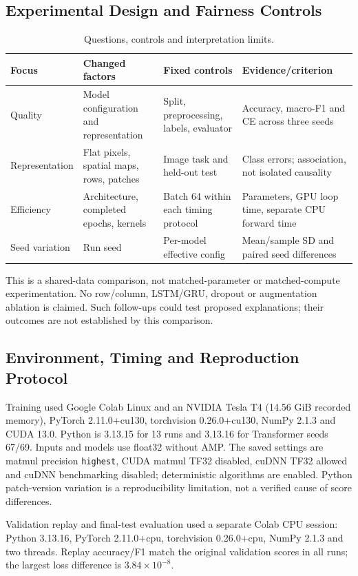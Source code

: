 \subsection{Experimental Design and Fairness Controls}
\begin{table}[H]\centering\small
\caption{Questions, controls and interpretation limits.}
\label{tab:design}
\begin{tabularx}{\linewidth}{>{\raggedright\arraybackslash}p{25mm}YYY}
\toprule Focus & Changed factors & Fixed controls & Evidence/criterion\\\midrule
Quality & Model configuration and representation & Split, preprocessing, labels, evaluator & Accuracy, macro-F1 and CE across three seeds\\
Representation & Flat pixels, spatial maps, rows, patches & Image task and held-out test & Class errors; association, not isolated causality\\
Efficiency & Architecture, completed epochs, kernels & Batch 64 within each timing protocol & Parameters, GPU loop time, separate CPU forward time\\
Seed variation & Run seed & Per-model effective config & Mean/sample SD and paired seed differences\\
\bottomrule
\end{tabularx}
\end{table}
This is a shared-data comparison, not matched-parameter or matched-compute
experimentation. No row/column, LSTM/GRU, dropout or augmentation ablation is
claimed. Such follow-ups could test proposed explanations; their outcomes
are not established by this comparison.

\subsection{Environment, Timing and Reproduction Protocol}
\label{sec:environment}
Training used Google Colab Linux and an NVIDIA Tesla T4 (14.56 GiB recorded memory),
PyTorch 2.11.0+cu130, torchvision 0.26.0+cu130, NumPy 2.1.3 and CUDA 13.0.
Python is 3.13.15 for 13 runs and 3.13.16 for Transformer seeds 67/69.
Inputs and models use float32 without AMP. The saved settings are matmul precision
\texttt{highest}, CUDA matmul TF32 disabled, cuDNN TF32 allowed and cuDNN
benchmarking disabled; deterministic algorithms are enabled. Python patch-version
variation is a reproducibility limitation, not a verified cause of score differences.

Validation replay and final-test evaluation used a separate Colab CPU session:
Python 3.13.16, PyTorch 2.11.0+cpu, torchvision 0.26.0+cpu, NumPy 2.1.3 and two
threads. Replay accuracy/F1 match the original validation scores in all runs;
the largest loss difference is \(3.84\times10^{-8}\).

